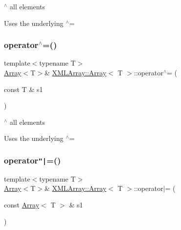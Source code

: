 $^\wedge$ all elements 

Uses the underlying $^\wedge$= \mbox{\label{classXMLArray_1_1Array_ac68e4b59911e762c271c90a6aa81e0c3}} 
\subsubsection{\texorpdfstring{operator$^\wedge$=()}{operator^=()}\hspace{0.1cm}{\footnotesize\ttfamily [4/4]}}
{\footnotesize\ttfamily template$<$typename T$>$ \\
\mbox{\hyperlink{classXMLArray_1_1Array}{Array}}$<$T$>$\& \mbox{\hyperlink{classXMLArray_1_1Array}{X\+M\+L\+Array\+::\+Array}}$<$ T $>$\+::operator$^\wedge$= (\begin{DoxyParamCaption}\item[{const T \&}]{s1 }\end{DoxyParamCaption})\hspace{0.3cm}{\ttfamily [inline]}}



$^\wedge$ all elements 

Uses the underlying $^\wedge$= \mbox{\label{classXMLArray_1_1Array_a4a61c5f3146f39c99758bad927e08de7}} 
\subsubsection{\texorpdfstring{operator\texttt{"|}=()}{operator|=()}\hspace{0.1cm}{\footnotesize\ttfamily [1/4]}}
{\footnotesize\ttfamily template$<$typename T$>$ \\
\mbox{\hyperlink{classXMLArray_1_1Array}{Array}}$<$T$>$\& \mbox{\hyperlink{classXMLArray_1_1Array}{X\+M\+L\+Array\+::\+Array}}$<$ T $>$\+::operator$\vert$= (\begin{DoxyParamCaption}\item[{const \mbox{\hyperlink{classXMLArray_1_1Array}{Array}}$<$ T $>$ \&}]{s1 }\end{DoxyParamCaption})\hspace{0.3cm}{\ttfamily [inline]}}



